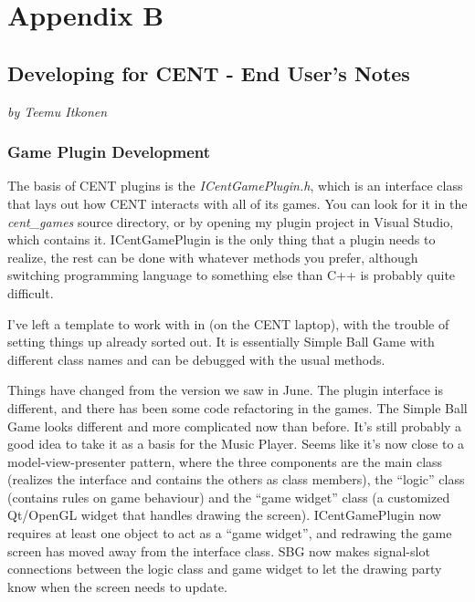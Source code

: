 \documentclass[letterpaper,10pt,english]{sphinxmanual}
\begin{document}
\chapter{Appendix B}
\label{index:id10}\label{index:appendix-b}

\section{\textbf{Developing for CENT - End User's Notes}}
\label{index:developing-for-cent-end-user-s-notes}
\emph{by Teemu Itkonen}


\subsection{\textbf{Game Plugin Development}}
\label{index:game-plugin-development}\label{index:game-dev}
The basis of CENT plugins is the \emph{ICentGamePlugin.h}, which is an interface class that lays out how CENT interacts with all of its games. You can look for it in the \emph{cent\_games} source directory, or by opening my plugin project in Visual Studio, which contains it. ICentGamePlugin is the only thing that a plugin needs to realize, the rest can be done with whatever methods you prefer, although switching programming language to something else than C++ is probably quite difficult.

I've left a template to work with in  (on the CENT laptop), with the trouble of setting things up already sorted out. It is essentially Simple Ball Game with different class names and can be debugged with the usual methods.

Things have changed from the version we saw in June. The plugin interface is different, and there has been some code refactoring in the games. The Simple Ball Game looks different and more complicated now than before. It's still probably a good idea to take it as a basis for the Music Player. Seems like it's now close to a model-view-presenter pattern, where the three components are the main class (realizes the interface and contains the others as class members), the ``logic'' class (contains rules on game behaviour) and the ``game widget'' class (a customized Qt/OpenGL widget that handles drawing the screen). ICentGamePlugin now requires at least one object to act as a ``game widget'', and redrawing the game screen has moved away from the interface class. SBG now makes signal-slot connections between the logic class and game widget to let the drawing party know when the screen needs to update.
\end{document}
